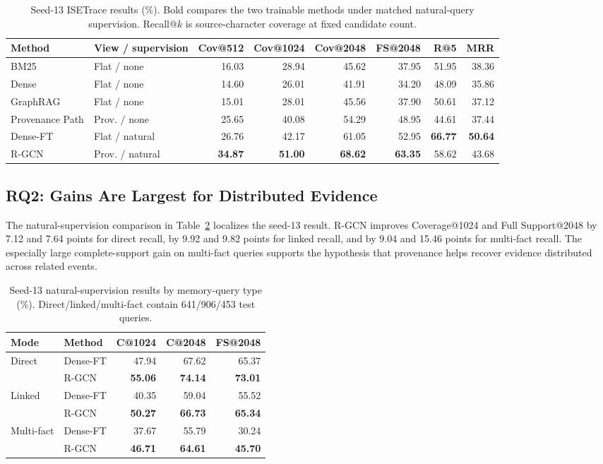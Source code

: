 \documentclass[sigconf,anonymous,review]{acmart}
\begin{document}
\begin{table}[t]
\centering
\small
\begin{tabular}{llrrrrrr}
\hline
Method & View / supervision & Cov@512 & Cov@1024 & Cov@2048 & FS@2048 & R@5 & MRR \\
\hline
BM25 & Flat / none & 16.03 & 28.94 & 45.62 & 37.95 & 51.95 & 38.36 \\
Dense & Flat / none & 14.60 & 26.01 & 41.91 & 34.20 & 48.09 & 35.86 \\
GraphRAG & Flat / none & 15.01 & 28.01 & 45.56 & 37.90 & 50.61 & 37.12 \\
Provenance Path & Prov. / none & 25.65 & 40.08 & 54.29 & 48.95 & 44.61 & 37.44 \\
\hline
Dense-FT & Flat / natural & 26.76 & 42.17 & 61.05 & 52.95 & \textbf{66.77} & \textbf{50.64} \\
R-GCN & Prov. / natural & \textbf{34.87} & \textbf{51.00} & \textbf{68.62} & \textbf{63.35} & 58.62 & 43.68 \\
\hline
\end{tabular}
\caption{Seed-13 ISETrace results (\%). Bold compares the two trainable methods under matched natural-query supervision. Recall@$k$ is source-character coverage at fixed candidate count.}
\label{tab:seed13}
\end{table}

\subsection{RQ2: Gains Are Largest for Distributed Evidence}

The natural-supervision comparison in Table~\ref{tab:strata} localizes the seed-13 result. R-GCN improves Coverage@1024 and Full Support@2048 by 7.12 and 7.64 points for direct recall, by 9.92 and 9.82 points for linked recall, and by 9.04 and 15.46 points for multi-fact recall. The especially large complete-support gain on multi-fact queries supports the hypothesis that provenance helps recover evidence distributed across related events.

\begin{table}[t]
\centering
\small
\begin{tabular}{llrrr}
\hline
Mode & Method & C@1024 & C@2048 & FS@2048 \\
\hline
Direct & Dense-FT & 47.94 & 67.62 & 65.37 \\
       & R-GCN & \textbf{55.06} & \textbf{74.14} & \textbf{73.01} \\
\hline
Linked & Dense-FT & 40.35 & 59.04 & 55.52 \\
       & R-GCN & \textbf{50.27} & \textbf{66.73} & \textbf{65.34} \\
\hline
Multi-fact & Dense-FT & 37.67 & 55.79 & 30.24 \\
           & R-GCN & \textbf{46.71} & \textbf{64.61} & \textbf{45.70} \\
\hline
\end{tabular}
\caption{Seed-13 natural-supervision results by memory-query type (\%). Direct/linked/multi-fact contain 641/906/453 test queries.}
\label{tab:strata}
\end{table}
\end{document}
